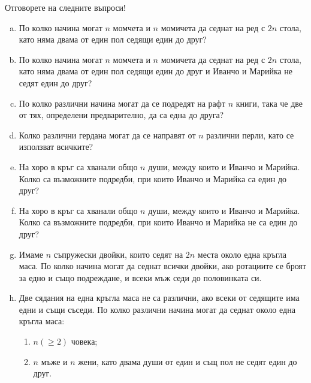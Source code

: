 \begin{problem}
  Отговорете на следните въпроси!
  \begin{enumerate}[a)]
  \item
    По колко начина могат $n$ момчета и $n$ момичета да седнат на ред с $2n$ стола, като няма двама от един пол седящи един до друг?
  \item
    По колко начина могат $n$ момчета и $n$ момичета да седнат на ред с $2n$ стола, като няма двама от един пол седящи един до друг и Иванчо и Марийка не седят един до друг? 
  \item
    По колко различни начина могат да се подредят на рафт $n$ книги, така че две от тях, определени предварително, да са една до друга?
  \item
    Колко различни гердана могат да се направят от $n$ различни перли, като се използват всичките?
  \item
    На хоро в кръг са хванали общо $n$ души, между които и Иванчо и Марийка.
    Колко са възможните подредби, при които Иванчо и Марийка са един до друг?
 \item
    На хоро в кръг са хванали общо $n$ души, между които и Иванчо и Марийка.
    Колко са възможните подредби, при които Иванчо и Марийка не са един до друг?
  \item
    Имаме $n$ съпружески двойки, които седят на $2n$ места около една кръгла маса. 
    По колко начина могат да седнат всички двойки, ако ротациите се броят за едно и също подреждане, и
    всеки мъж седи до половинката си.
  \item
    Две сядания на една кръгла маса не са различни, ако всеки от седящите има едни и същи съседи.
    По колко различни начина могат да седнат около една кръгла маса:
    \begin{enumerate}
    \item
      $n (\geq 2)$ човека;
    \item
      $n$ мъже и $n$ жени, като двама души от един и същ пол не седят един до друг.
    \end{enumerate}
  \end{enumerate}
\end{problem}

